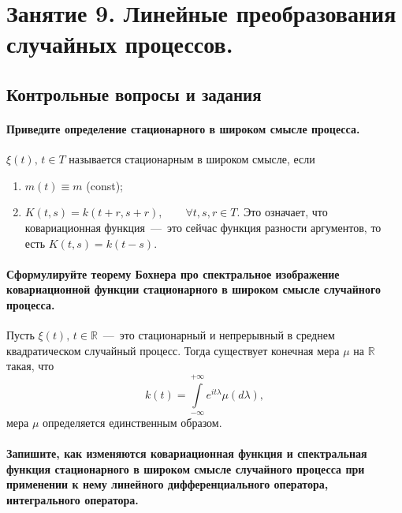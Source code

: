 \chapter*{Занятие 9. Линейные преобразования случайных процессов.}

\section*{Контрольные вопросы и задания}

\subsubsection*{Приведите определение стационарного в широком смысле процесса.}

$ \xi \left( t \right), \, t \in T$ называется стационарным в широком смысле, если
\begin{enumerate}
  \item $m \left( t  \right) \equiv m$ (const);
  \item $K \left( t, s \right) = k \left( t + r, s + r \right), \qquad \forall t, s, r \in T$.
  Это означает, что ковариационная функция~---~это сейчас функция разности аргументов,
  то есть $K \left( t, s \right) = k \left( t - s \right) $.
\end{enumerate}

\subsubsection*{Сформулируйте теорему Бохнера про спектральное изображение ковариационной функции
                стационарного в широком смысле случайного процесса.}

Пусть $ \xi \left( t \right), \, t \in \mathbb{R}$~---~это
стационарный и непрерывный в среднем квадратическом случайный процесс.
Тогда существует конечная мера $ \mu $ на $ \mathbb{R}$ такая, что
\begin{equation*}
  k \left( t \right) =
  \int \limits_{-\infty }^{+\infty } e^{it \lambda } \mu \left( d \lambda \right),
\end{equation*}
мера $ \mu $ определяется единственным образом.

\subsubsection*{Запишите, как изменяются ковариационная функция и спектральная функция стационарного
                в широком смысле случайного процесса при применении к нему линейного
                дифференциального оператора, интегрального оператора.}

